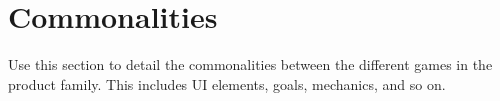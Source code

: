 \section{Commonalities}

Use this section to detail the commonalities between the different games in the product family. This includes UI elements, goals, mechanics, and so on.